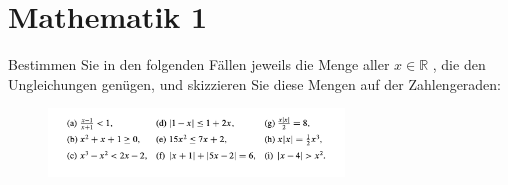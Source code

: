 \documentclass[addpoints,12pt]{exam} %
\begin{document}
\section*{Mathematik 1}

\begin{questions}
\question Bestimmen Sie in den folgenden Fällen jeweils die Menge aller \(  x \in \mathbb{R} \)  , die den Ungleichungen genügen, und skizzieren Sie diese Mengen auf der Zahlengeraden: 

\begin{figure}[h]
\includegraphics[width=0.7\textwidth]{auf5}
\end{figure}
\end{questions}
\end{document}
